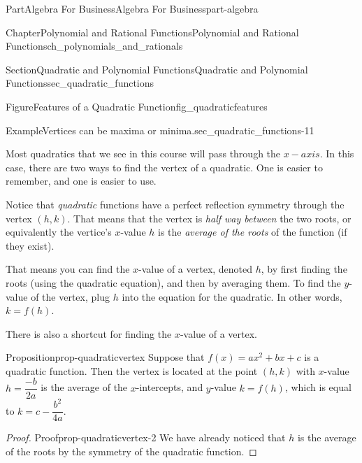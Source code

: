 \documentclass{tufte-book}
\numberwithin{equation}{chapter}
\begin{document}
\begin{partptx}{Part}{Algebra For Business}{}{Algebra For Business}{}{}{part-algebra}
\begin{chapterptx}{Chapter}{Polynomial and Rational Functions}{}{Polynomial and Rational Functions}{}{}{ch_polynomials_and_rationals}
\begin{sectionptx}{Section}{Quadratic and Polynomial Functions}{}{Quadratic and Polynomial Functions}{}{}{sec_quadratic_functions}
\begin{figureptx}{Figure}{Features of a Quadratic Function}{fig_quadraticfeatures}{}
\begin{image}{0.3}{0.4}{0.3}{}
{\begin{tikzpicture}
\end{tikzpicture}
}%
\end{image}%
\tcblower
\end{figureptx}%
\begin{example}{Example}{Vertices can be maxima or minima.}{sec_quadratic_functions-11}%
\begin{image}{0.125}{0.75}{0.125}{}%
%
\end{image}%
\end{example}
Most quadratics that we see in this course will pass through the \(x-axis\).  In this case, there are two ways to find the vertex of a quadratic.  One is easier to remember, and one is easier to use.%
\par
Notice that \emph{quadratic} functions have a perfect reflection symmetry through the vertex \((h,k)\). That means that the vertex is \emph{half way between} the two roots, or equivalently the vertice's \(x\)-value \(h\) is the \emph{average of the roots} of the function (if they exist).%
\par
That means you can find the \(x\)-value of a vertex, denoted \(h\), by first finding the roots (using the quadratic equation), and then by averaging them. To find the \(y\)-value of the vertex, plug \(h\) into the equation for the quadratic.  In other words, \(k=f(h)\).%
\par
There is also a shortcut for finding the \(x\)-value of a vertex.%
\begin{proposition}{Proposition}{}{}{prop-quadraticvertex}%
Suppose that \(f(x)=ax^2+ bx + c\) is a quadratic function.  Then the vertex is located at the point \((h,k)\) with \(x\)-value \(h=\dfrac{-b}{2a}\) is the average of the \(x\)-intercepts, and \(y\)-value \(k = f(h)\), which is equal to \(k=c-\dfrac{b^2}{4a}\).%
\end{proposition}
\begin{proof}{Proof}{}{prop-quadraticvertex-2}
We have already noticed that \(h\) is the average of the roots by the symmetry of the quadratic function.%

\end{proof}
\end{sectionptx}
\end{chapterptx}
\end{partptx}
\end{document}
